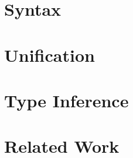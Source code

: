 \documentclass[acmsmall,review,anonymous,nonacm]{acmart}
\begin{document}
\section{Syntax}
\label{sec:syntax}


% 

\section{Unification}
\label{sec:unification}


\section{Type Inference}
\label{sec:typeinference}


\section{Related Work}
\label{sec:relatedwork}


% 




\appendix
\end{document}
